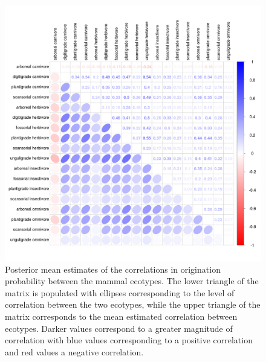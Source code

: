 \documentclass[12pt,letterpaper]{article}
\begin{document}
\begin{figure}[ht]
  \centering
  \includegraphics[width=\textwidth,height=\textheight,keepaspectratio=true]{figure/origination_correlation}
  \caption[Estimated correlations in origination probability between ecotypes]{Posterior mean estimates of the correlations in origination probability between the mammal ecotypes. The lower triangle of the matrix is populated with ellipses corresponding to the level of correlation between the two ecotypes, while the upper triangle of the matrix corresponds to the mean estimated correlation between ecotypes. Darker values correspond to a greater magnitude of correlation with blue values corresponding to a positive correlation and red values a negative correlation.}
  \label{fig:origin_corr}
\end{figure}
\end{document}
